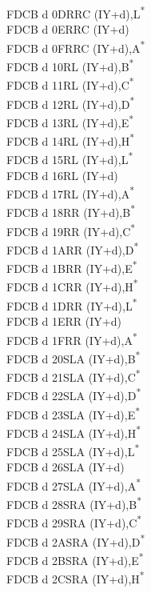 \documentclass[twoside,openright,a4paper]{book}
\begin{document}
\begin{multicols}{3}
{\begin{tabbing}
	FDCB d 0D\>RRC (IY+d),L\textsuperscript{*}\\
	FDCB d 0E\>RRC (IY+d)\\
	FDCB d 0F\>RRC (IY+d),A\textsuperscript{*}\\
	FDCB d 10\>RL (IY+d),B\textsuperscript{*}\\
	FDCB d 11\>RL (IY+d),C\textsuperscript{*}\\
	FDCB d 12\>RL (IY+d),D\textsuperscript{*}\\
	FDCB d 13\>RL (IY+d),E\textsuperscript{*}\\
	FDCB d 14\>RL (IY+d),H\textsuperscript{*}\\
	FDCB d 15\>RL (IY+d),L\textsuperscript{*}\\
	FDCB d 16\>RL (IY+d)\\
	FDCB d 17\>RL (IY+d),A\textsuperscript{*}\\
	FDCB d 18\>RR (IY+d),B\textsuperscript{*}\\
	FDCB d 19\>RR (IY+d),C\textsuperscript{*}\\
	FDCB d 1A\>RR (IY+d),D\textsuperscript{*}\\
	FDCB d 1B\>RR (IY+d),E\textsuperscript{*}\\
	FDCB d 1C\>RR (IY+d),H\textsuperscript{*}\\
	FDCB d 1D\>RR (IY+d),L\textsuperscript{*}\\
	FDCB d 1E\>RR (IY+d)\\
	FDCB d 1F\>RR (IY+d),A\textsuperscript{*}\\
	FDCB d 20\>SLA (IY+d),B\textsuperscript{*}\\
	FDCB d 21\>SLA (IY+d),C\textsuperscript{*}\\
	FDCB d 22\>SLA (IY+d),D\textsuperscript{*}\\
	FDCB d 23\>SLA (IY+d),E\textsuperscript{*}\\
	FDCB d 24\>SLA (IY+d),H\textsuperscript{*}\\
	FDCB d 25\>SLA (IY+d),L\textsuperscript{*}\\
	FDCB d 26\>SLA (IY+d)\\
	FDCB d 27\>SLA (IY+d),A\textsuperscript{*}\\
	FDCB d 28\>SRA (IY+d),B\textsuperscript{*}\\
	FDCB d 29\>SRA (IY+d),C\textsuperscript{*}\\
	FDCB d 2A\>SRA (IY+d),D\textsuperscript{*}\\
	FDCB d 2B\>SRA (IY+d),E\textsuperscript{*}\\
	FDCB d 2C\>SRA (IY+d),H\textsuperscript{*}\\

\end{tabbing}}
\end{multicols}
\end{document}
